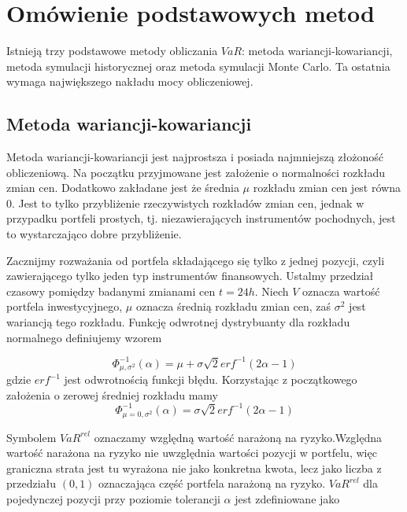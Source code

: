 \documentclass[11pt,titlepage]{article}
\numberwithin{equation}{section}
\begin{document}
\section{Omówienie podstawowych metod}
Istnieją trzy podstawowe metody obliczania $VaR$: metoda wariancji-kowariancji, metoda symulacji historycznej oraz metoda symulacji Monte Carlo. Ta ostatnia wymaga największego nakładu mocy obliczeniowej.



\subsection{Metoda wariancji-kowariancji}


Metoda wariancji-kowariancji jest najprostsza i posiada najmniejszą złożoność obliczeniową. Na początku przyjmowane jest założenie o normalności rozkładu zmian cen. Dodatkowo zakładane jest że średnia $\mu$ rozkładu zmian cen jest równa 0. Jest to tylko przybliżenie rzeczywistych rozkładów zmian cen, jednak w przypadku portfeli prostych, tj. niezawierających instrumentów pochodnych, jest to wystarczająco dobre przybliżenie. 

Zacznijmy rozważania od portfela składającego się tylko z jednej pozycji, czyli zawierającego tylko jeden typ instrumentów finansowych. Ustalmy przedział czasowy pomiędzy badanymi zmianami cen $t=24h$. Niech $V$ oznacza wartość portfela inwestycyjnego, $\mu$ oznacza średnią rozkładu zmian cen, zaś $\sigma^{2}$ jest wariancją tego rozkładu. Funkcję odwrotnej dystrybuanty dla rozkładu normalnego definiujemy wzorem 




\begin{equation} 
\Phi_{\mu,\sigma^{2}}^{-1}(\alpha)=\mu+\sigma \sqrt{2} erf^{-1}(2\alpha-1)
\end{equation} 
gdzie $erf^{-1}$ jest odwrotnością funkcji błędu. Korzystając z początkowego założenia o zerowej średniej rozkładu mamy
$$\Phi_{\mu=0,\sigma^{2}}^{-1}(\alpha)=\sigma \sqrt{2} erf^{-1}(2\alpha-1)$$



Symbolem $VaR^{rel}$ oznaczamy względną wartość narażoną na ryzyko.Względna wartość narażona na ryzyko nie uwzględnia wartości pozycji w portfelu, więc graniczna strata jest tu wyrażona nie jako konkretna kwota, lecz jako liczba z przedziału $(0,1)$ oznaczająca część portfela narażoną na ryzyko. $VaR^{rel}$ dla pojedynczej pozycji przy poziomie tolerancji $\alpha$ jest zdefiniowane jako
\end{document}
